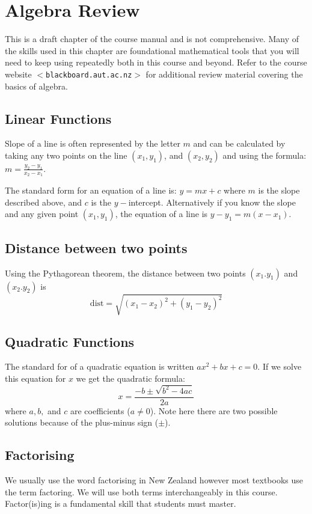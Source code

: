 \chapter{Algebra Review}
This is a draft chapter of the course manual and is not comprehensive. Many of the skills used in this chapter are foundational mathematical tools that you will need to keep using repeatedly both in this course and beyond. Refer to the course website $<$\texttt{blackboard.aut.ac.nz}$>$ for additional review material covering the basics of algebra.

 \section{Linear Functions}
 Slope of a line is often represented by the letter $m$ and can be calculated by taking any two points on the line $(x_1,y_1)$, and $(x_2,y_2)$ and using the formula: $m =\frac{y_{2} -y_{1}}{x_{2} -x_{1}}$.
 
 The standard form for an equation of a line is: $y =m x +c$ where $m$ is the slope described above, and $c$ is the $y-$intercept. Alternatively if you know the slope and any given point $(x_1,y_1)$, the equation of a line is $y -y_{1} =m (x -x_{1})$.

\section{Distance between two points}
Using the Pythagorean theorem, the distance between two points $\left (x_{1} .y_{1}\right )$ and $\left (x_{2} .y_{2}\right )$ is $$\text{dist}=\sqrt{\left (x_{1} -x_{2}\right )^{2} +\left (y_{1} -y_{2}\right )^{2}}$$ 

 \section{Quadratic Functions}
 The standard for of a quadratic equation is written $a x^{2} +b x +c =0$. If we solve this equation for $x$ we get the quadratic formula:
 $$x =\frac{ -b \pm \sqrt{b^{2} -4 a c}}{2 a}$$ 
 where $a,b,$ and $c$ are coefficients ($a\ne0$). Note here there are two possible solutions because of the plus-minus sign ($\pm$).
 
 \section{Factorising}
 We usually use the word factorising in New Zealand however most textbooks use the term factoring. We will use both terms interchangeably in this course. Factor(is)ing is a fundamental skill that students must master.  
 
